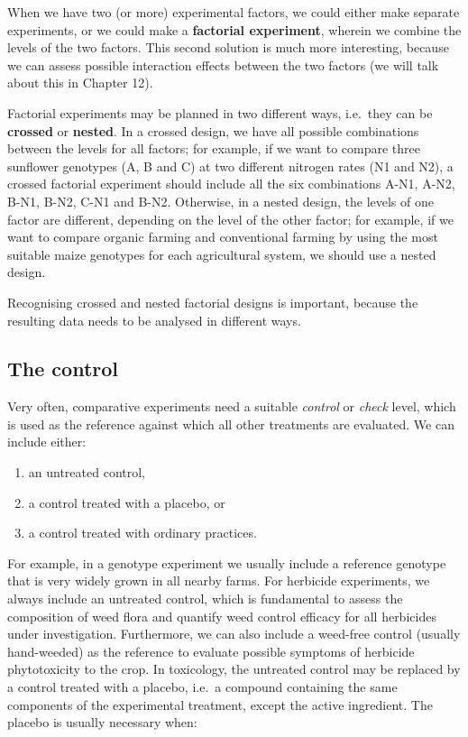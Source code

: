 \documentclass[a4paper,12pt,oneside]{book}
\providecommand{\tightlist}{%
  \setlength{\itemsep}{0pt}\setlength{\parskip}{0pt}}
\begin{document}
When we have two (or more) experimental factors, we could either make separate experiments, or we could make a \textbf{factorial experiment}, wherein we combine the levels of the two factors. This second solution is much more interesting, because we can assess possible interaction effects between the two factors (we will talk about this in Chapter 12).

Factorial experiments may be planned in two different ways, i.e.~they can be \textbf{crossed} or \textbf{nested}. In a crossed design, we have all possible combinations between the levels for all factors; for example, if we want to compare three sunflower genotypes (A, B and C) at two different nitrogen rates (N1 and N2), a crossed factorial experiment should include all the six combinations A-N1, A-N2, B-N1, B-N2, C-N1 and B-N2. Otherwise, in a nested design, the levels of one factor are different, depending on the level of the other factor; for example, if we want to compare organic farming and conventional farming by using the most suitable maize genotypes for each agricultural system, we should use a nested design.

Recognising crossed and nested factorial designs is important, because the resulting data needs to be analysed in different ways.

\hypertarget{the-control}{%
\subsection{The control}\label{the-control}}

Very often, comparative experiments need a suitable \emph{control} or \emph{check} level, which is used as the reference against which all other treatments are evaluated. We can include either:

\begin{enumerate}
\def\labelenumi{\arabic{enumi}.}
\tightlist
\item
  an untreated control,
\item
  a control treated with a placebo, or
\item
  a control treated with ordinary practices.
\end{enumerate}

For example, in a genotype experiment we usually include a reference genotype that is very widely grown in all nearby farms. For herbicide experiments, we always include an untreated control, which is fundamental to assess the composition of weed flora and quantify weed control efficacy for all herbicides under investigation. Furthermore, we can also include a weed-free control (usually hand-weeded) as the reference to evaluate possible symptoms of herbicide phytotoxicity to the crop. In toxicology, the untreated control may be replaced by a control treated with a placebo, i.e.~a compound containing the same components of the experimental treatment, except the active ingredient. The placebo is usually necessary when:
\end{document}

